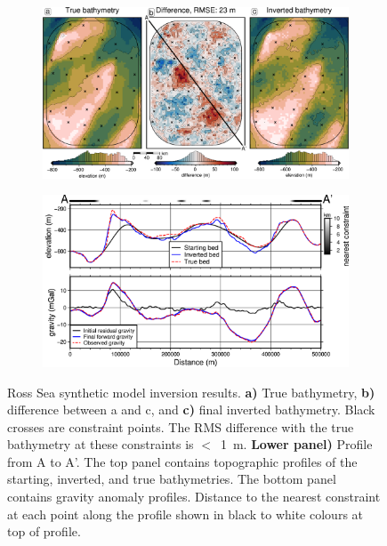 \begin{figure}[!ht]
  \centering
    \begin{subfigure}[t]{.9\textwidth}
        \centering
        \includegraphics[width=\textwidth]{figures/chp3/chp3_Ross_Sea_results.png}
    \end{subfigure}
    \begin{subfigure}[t]{.7\textwidth}
        \centering
        \includegraphics[width=\textwidth]{figures/chp3/chp3_Ross_Sea_profile.png}
    \end{subfigure}
  \caption[Ross Sea inversion results]{Ross Sea synthetic model inversion results. \textbf{a)} True bathymetry, \textbf{b)} difference between a and c, and \textbf{c)} final inverted bathymetry. Black crosses are constraint points. The RMS difference with the true bathymetry at these constraints is $<$~1~m. \textbf{Lower panel)} Profile from A to A'. The top panel contains topographic profiles of the starting, inverted, and true bathymetries. The bottom panel contains gravity anomaly profiles. Distance to the nearest constraint at each point along the profile shown in black to white colours at top of profile.}
    \label{fig:chp3_Ross_Sea_results}
\end{figure}

